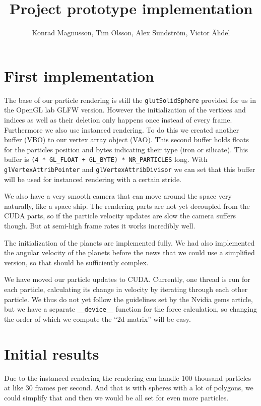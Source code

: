 \documentclass[11pt,a4paper,article,oneside]{memoir}
\title{Project prototype implementation}
\author{Konrad Magnusson, Tim Olsson, Alex Sundström, Victor Ähdel}
\begin{document}
\maketitle

\chapter{First implementation}
The base of our particle rendering is still the \verb|glutSolidSphere| provided for us in the OpenGL lab GLFW version. 
However the initialization of the vertices and indices as well as their deletion only happens once instead of every frame. 
Furthermore we also use instanced rendering.
To do this we created another buffer (VBO) to our vertex array object (VAO). 
This second buffer holds floats for the particles position and bytes indicating their type (iron or silicate). 
This buffer is \verb|(4 * GL_FLOAT + GL_BYTE) * NR_PARTICLES| long. 
With \verb|glVertexAttribPointer| and \verb|glVertexAttribDivisor| we can set that this buffer will be used for instanced rendering with a certain stride. 

We also have a very smooth camera that can move around the space very naturally, like a space ship.
The rendering parts are not yet decoupled from the CUDA parts, so if the particle velocity updates are slow the camera suffers though.
But at semi-high frame rates it works incredibly well.

The initialization of the planets are implemented fully.
We had also implemented the angular velocity of the planets before the news that we could use a simplified version, so that should be sufficiently complex.

We have moved our particle updates to CUDA.
Currently, one thread is run for each particle, calculating its change in velocity by iterating through each other particle.
We thus do not yet follow the guidelines set by the Nvidia gems article, but we have a separate \verb|__device__| function for the force calculation, so changing the order of which we compute the ``2d matrix'' will be easy.


\chapter{Initial results}
Due to the instanced rendering the rendering can handle 100 thousand particles at like 30 frames per second.
And that is with spheres with a lot of polygons, we could simplify that and then we would be all set for even more particles.
\end{document}
